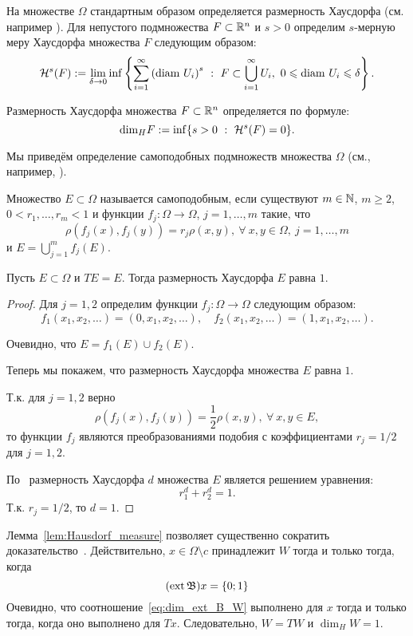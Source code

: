 На множестве $\Omega$ стандартным образом определяется размерность Хаусдорфа (см. например \cite[Секция 6]{Edgar}).
Для непустого подмножества $F\subset \mathbb{R}^n$ и $s > 0$ определим $s$-мерную меру Хаусдорфа множества $F$ следующим образом:
$$\mathcal H^s(F) := \lim_{\delta\to0} \inf \left\{\sum_{i=1}^\infty \left({\rm diam} \ U_i \right)^s \ : \ F\subset \bigcup_{i=1}^\infty  U_i, \  0\leqslant {\rm diam} \ U_i \leqslant \delta \right\}.$$

Размерность Хаусдорфа множества  $F\subset \mathbb{R}^n$ определяется по формуле:
$${\rm dim}_H F := \inf\{ s > 0 \ : \ \mathcal H^s(F)=0\}.$$



Мы приведём определение самоподобных подмножеств множества $\Omega$ (см., например, \cite{falconer1997techniques}).

\begin{definition}
Множество $E\subset\Omega$ называется самоподобным, если существуют $m\in\mathbb{N}$,
$m\geqslant2$, $0< r_1, \dots, r_m<1$ и функции $f_j : \Omega \to \Omega$, $j=1,\dots, m$ такие, что
$$\rho(f_j(x), f_j(y)) = r_j \rho(x,y), \ \forall \ x,y \in \Omega, \ j=1,\dots, m$$
и $E=\bigcup_{j=1}^m f_j(E).$
\end{definition}



\begin{lemma}
	\label{lem:Hausdorf_measure}
	Пусть $E\subset\Omega$ и $TE = E$.
	Тогда размерность Хаусдорфа $E$ равна $1$.
\end{lemma}

\begin{proof}
	Для $j=1,2$ определим функции $f_j : \Omega \to \Omega$ следующим образом:
	$$f_1(x_1, x_2, \dots)=(0, x_1, x_2, \dots), \quad f_2(x_1, x_2, \dots)=(1, x_1, x_2, \dots).$$

	Очевидно, что $E=f_1(E)\cup f_2(E).$

	Теперь мы покажем, что размерность Хаусдорфа множества $E$ равна $1$.

	Т.к. для $j=1,2$ верно
	 $$\rho(f_j(x),f_j(y))=\frac12\rho(x,y), \ \forall \ x, y \in E,$$
	 то функции $f_j$ являются преобразованиями подобия с коэффициентами $r_j=1/2$ для $j=1,2$.


	По~\cite[Теорема 9.3]{Edgar} размерность Хаусдорфа $d$ множества $E$ является решением уравнения:
	$$ r_1^d+r_2^d=1.$$
	Т.к. $r_j=1/2$, то
	$d=1.$
\end{proof}

Лемма~\ref{lem:Hausdorf_measure} позволяет существенно сократить доказательство~\cite[утверждение 12]{avdeed2021AandA}.
Действительно, $x\in\Omega\setminus c$ принадлежит $W$ тогда и только тогда, когда
\begin{equation}
	\label{eq:dim_ext_B_W}
	(\ext \mathfrak{B})x = \{0;1\}
\end{equation}
Очевидно, что соотношение~\eqref{eq:dim_ext_B_W} выполнено для $x$ тогда и только тогда, когда оно выполнено для $Tx$.
Следовательно, $W=TW$ и $\dim_H W = 1$.

